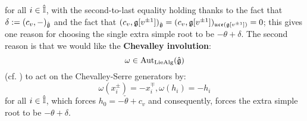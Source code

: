         for all $i \in \hat{\mathbb{I}}$, with the second-to-last equality holding thanks to the fact that $\delta := (c_v, -)_{\hat{\mathfrak{g}}}$ and the fact that $(c_v, \mathfrak{g}[v^{\pm 1}])_{\hat{\mathfrak{g}}} = (c_v, \mathfrak{g}[v^{\pm 1}])_{\mathfrak{uce}(\mathfrak{g}[v^{\pm 1}])} = 0$; this gives one reason for choosing the single extra simple root to be $-\theta + \delta$. The second reason is that we would like the \textbf{Chevalley involution}:
            $$\omega \in \mathrm{Aut}_{\mathrm{Lie}\mathrm{Alg}}(\hat{\mathfrak{g}})$$
        (cf. \cite[p. 7]{kac_infinite_dimensional_lie_algebras}) to act on the Chevalley-Serre generators by:
            $$\omega(x_i^{\pm}) = -x_i^{\mp}, \omega(h_i) = -h_i$$
        for all $i \in \hat{\mathbb{I}}$, which forces $h_0 = -\check{\theta} + c_v$ and consequently, forces the extra simple root to be $-\theta + \delta$.
        
